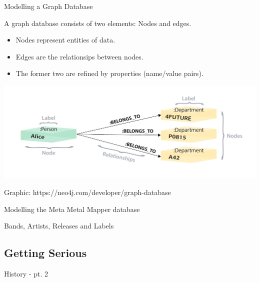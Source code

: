 \documentclass{beamer}
\begin{document}
    \begin{frame}{Modelling a Graph Database}

      A graph database consists of two elements: Nodes and edges.

      \begin{itemize}

        \item Nodes represent entities of data.
        \item Edges are the relationsips between nodes.\pause
        \item The former two are refined by properties (name/value pairs).
      \end{itemize}
      
      \begin{center}
        \includegraphics[scale=.2]{relational_graph_model}
      \end{center}
      
      Graphic: https://neo4j.com/developer/graph-database
      
    \end{frame}
    
    \begin{frame}{Modelling the Meta Metal Mapper database}
    
      Bands, Artists, Releases and Labels
    
    \end{frame}

  \subsection{Getting Serious}
  
    \begin{frame}{History - pt. 2}
    
    
    \end{frame}

\end{document}
